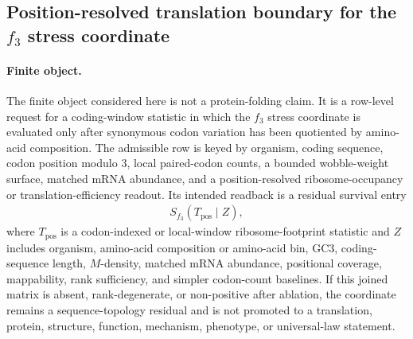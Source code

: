 \subsection{Position-resolved translation boundary for the $f_3$ stress coordinate}\label{sec:bioreality-f3-stress-position-resolved-ribosome-occupancy-translation-boundary}

\paragraph{Finite object.}
The finite object considered here is not a protein-folding claim.  It is a row-level request for a coding-window statistic in which the $f_3$ stress coordinate is evaluated only after synonymous codon variation has been quotiented by amino-acid composition.  The admissible row is keyed by organism, coding sequence, codon position modulo $3$, local paired-codon counts, a bounded wobble-weight surface, matched mRNA abundance, and a position-resolved ribosome-occupancy or translation-efficiency readout.  Its intended readback is a residual survival entry
$$
\begin{aligned}
S_{f_3}(T_{\mathrm{pos}}\mid Z),
\end{aligned}
$$
where $T_{\mathrm{pos}}$ is a codon-indexed or local-window ribosome-footprint statistic and $Z$ includes organism, amino-acid composition or amino-acid bin, GC3, coding-sequence length, $M$-density, matched mRNA abundance, positional coverage, mappability, rank sufficiency, and simpler codon-count baselines.  If this joined matrix is absent, rank-degenerate, or non-positive after ablation, the coordinate remains a sequence-topology residual and is not promoted to a translation, protein, structure, function, mechanism, phenotype, or universal-law statement.

